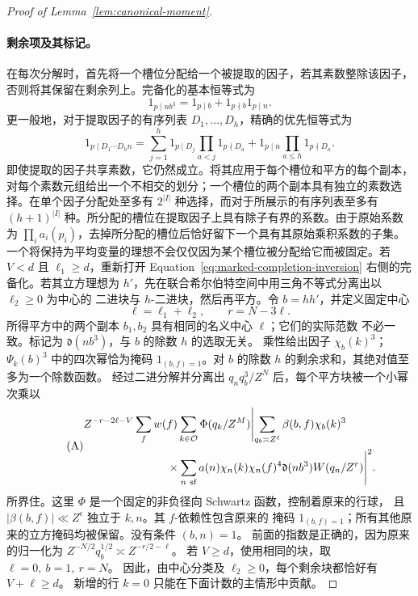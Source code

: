 \documentclass[11pt,a4paper]{article}
\numberwithin{equation}{section}
\numberwithin{figure}{section}
\theoremstyle{definition}
\theoremstyle{remark}
\begin{document}
\begin{proof}[Proof of Lemma~\ref{lem:canonical-moment}]
\paragraph{剩余项及其标记。}
在每次分解时，首先将一个槽位分配给一个被提取的因子，若其素数整除该因子，否则将其保留在剩余列上。完备化的基本恒等式为
\begin{equation}\label{old-eq:4.12}
 1_{p\mid nb^3}=1_{p\mid b}+1_{p\nmid b}1_{p\mid n}.
\end{equation}
更一般地，对于提取因子的有序列表
\(D_1,\ldots,D_h\)，精确的优先恒等式为
\begin{equation}\label{eq:inverse-slot-priority}
 1_{p\mid D_1\cdots D_hn}
 =\sum_{j=1}^h1_{p\mid D_j}\prod_{a<j}1_{p\nmid D_a}
   +1_{p\mid n}\prod_{a\le h}1_{p\nmid D_a}.
\end{equation}
即使提取的因子共享素数，它仍然成立。将其应用于每个槽位和平方的每个副本，对每个素数元组给出一个不相交的划分；一个槽位的两个副本具有独立的素数选择。在单个因子分配处至多有 \(2^{|I|}\) 种选择，而对于所展示的有序列表至多有 \((h+1)^{|I|}\) 种。所分配的槽位在提取因子上具有除子有界的系数。由于原始系数为
\(\prod_i a_i(p_i)\)，去掉所分配的槽位后恰好留下一个具有其原始乘积系数的子集。一个将保持为平均变量的理想不会仅仅因为某个槽位被分配给它而被固定。若 \(V<d\) 且 \(\ell_1\ge d\)，重新打开
Equation~\eqref{eq:marked-completion-inversion} 右侧的完备化。若其立方理想为
\(h'\)，先在联合希尔伯特空间中用三角不等式分离出以 \(\ell_2\ge0\) 为中心的
二进块与 \(h\)-二进块，然后再平方。令 \(b=hh'\)，并定义固定中心
\[
 \ell=\ell_1+\ell_2,\qquad r=N-3\ell.
\]
所得平方中的两个副本 \(b_1,b_2\) 具有相同的名义中心 \(\ell\)；它们的实际范数
不必一致。标记为 \(\mathfrak d(nb^3)\)，与 \(b\) 的除数 \(h\) 的选取无关。
乘性给出因子 \(\chi_b(k)^3\)；\(\Psi_k(b)^3\) 中的四次幂恰为掩码
\(1_{(b,f)=1}\)。对 \(b\) 的除数 \(h\) 的剩余求和，其绝对值至多为一个除数函数。
经过二进分解并分离出 \(q_nq_b^3/Z^N\) 后，每个平方块被一个小幂次乘以
\begin{equation}\tag{A}\label{eq:canonical-block}
 \begin{split}
 &Z^{-r-2\ell-V}\sum_f w(f)\sum_{k\in\mathcal O}\Phi(q_k/Z^M)
 \Biggl|\sum_{q_b\asymp Z^\ell}\beta(b,f)\chi_b(k)^3\\
 &\hspace{26mm}\times
       \sum_{n\ {\rm sf}}a(n)\chi_n(k)\chi_n(f)^4
       \mathfrak d(nb^3)W(q_n/Z^r)\Biggr|^2 .
 \end{split}
\end{equation}
所界住。这里 \(\Phi\) 是一个固定的非负径向 Schwartz 函数，控制着原来的行球，
且 \(|\beta(b,f)|\ll Z^\epsilon\) 独立于 \(k,n\)。其 \(f\)-依赖性包含原来的
掩码 \(1_{(b,f)=1}\)；所有其他原来的立方掩码均被保留。没有条件 \((b,n)=1\)。
前面的指数是正确的，因为原来的归一化为
\(Z^{-N/2}q_b^{1/2}\asymp Z^{-r/2-\ell}\)。
若 \(V\ge d\)，使用相同的块，取 \(\ell=0,\ b=1,\ r=N\)。
因此，由中心分类及 \(\ell_2\ge0\)，每个剩余块都恰好有 \(V+\ell\ge d\)。
新增的行 \(k=0\) 只能在下面计数的主情形中贡献。


\end{proof}
\end{document}
